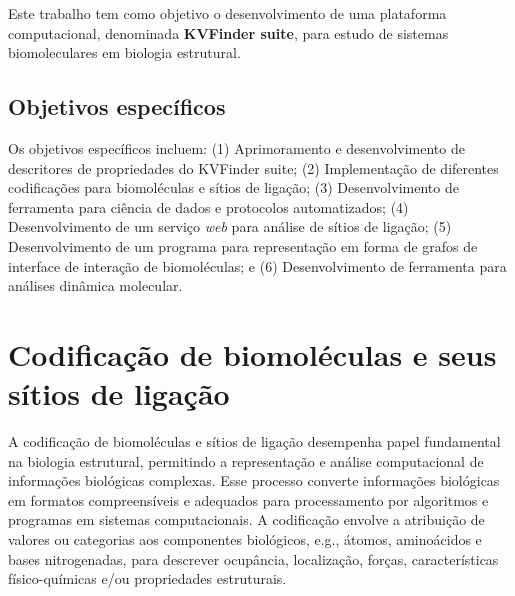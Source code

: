 \documentclass[Portugues]{phdquali}
\def\eg{e.g.\onedot}
\begin{document}
Este trabalho tem como objetivo o desenvolvimento de uma plataforma computacional, denominada \textbf{KVFinder suite}, para estudo de sistemas biomoleculares em biologia estrutural.

\section{Objetivos específicos}

Os objetivos específicos incluem: (1) Aprimoramento e desenvolvimento de descritores de propriedades do KVFinder suite; (2) Implementação de diferentes codificações para biomoléculas e sítios de ligação; (3) Desenvolvimento de ferramenta para ciência de dados e protocolos automatizados; (4) Desenvolvimento de um serviço \textit{web} para análise de sítios de ligação; (5) Desenvolvimento de um programa para representação em forma de grafos de interface de interação de biomoléculas; e (6) Desenvolvimento de ferramenta para análises dinâmica molecular.


\chapter{Codificação de biomoléculas e seus sítios de ligação}

A codificação de biomoléculas e sítios de ligação desempenha papel fundamental na biologia estrutural, permitindo a representação e análise computacional de informações biológicas complexas. Esse processo converte informações biológicas em formatos compreensíveis e adequados para processamento por algoritmos e programas em sistemas computacionais. A codificação envolve a atribuição de valores ou categorias aos componentes biológicos, \eg, átomos, aminoácidos e bases nitrogenadas, para descrever ocupância, localização, forças, características físico-químicas e/ou propriedades estruturais. 
\end{document}
